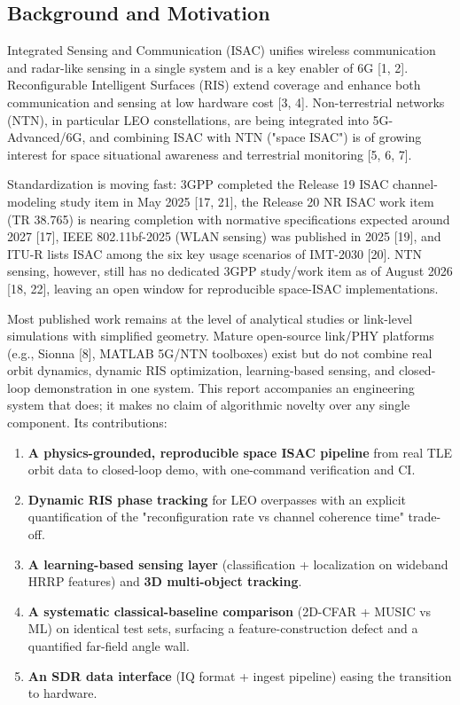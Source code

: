\documentclass[11pt]{article}
\begin{document}
\subsection{Background and Motivation}

Integrated Sensing and Communication (ISAC) unifies wireless communication and radar-like sensing in a single system and is a key enabler of 6G [1, 2]. Reconfigurable Intelligent Surfaces (RIS) extend coverage and enhance both communication and sensing at low hardware cost [3, 4]. Non-terrestrial networks (NTN), in particular LEO constellations, are being integrated into 5G-Advanced/6G, and combining ISAC with NTN ("space ISAC") is of growing interest for space situational awareness and terrestrial monitoring [5, 6, 7].

Standardization is moving fast: 3GPP completed the Release 19 ISAC channel-modeling study item in May 2025 [17, 21], the Release 20 NR ISAC work item (TR 38.765) is nearing completion with normative specifications expected around 2027 [17], IEEE 802.11bf-2025 (WLAN sensing) was published in 2025 [19], and ITU-R lists ISAC among the six key usage scenarios of IMT-2030 [20]. NTN sensing, however, still has no dedicated 3GPP study/work item as of August 2026 [18, 22], leaving an open window for reproducible space-ISAC implementations.

Most published work remains at the level of analytical studies or link-level simulations with simplified geometry. Mature open-source link/PHY platforms (e.g., Sionna [8], MATLAB 5G/NTN toolboxes) exist but do not combine real orbit dynamics, dynamic RIS optimization, learning-based sensing, and closed-loop demonstration in one system. This report accompanies an engineering system that does; it makes no claim of algorithmic novelty over any single component. Its contributions:

\begin{enumerate}
\item \textbf{A physics-grounded, reproducible space ISAC pipeline} from real TLE orbit data to closed-loop demo, with one-command verification and CI.
\item \textbf{Dynamic RIS phase tracking} for LEO overpasses with an explicit quantification of the "reconfiguration rate vs channel coherence time" trade-off.
\item \textbf{A learning-based sensing layer} (classification + localization on wideband HRRP features) and \textbf{3D multi-object tracking}.
\item \textbf{A systematic classical-baseline comparison} (2D-CFAR + MUSIC vs ML) on identical test sets, surfacing a feature-construction defect and a quantified far-field angle wall.
\item \textbf{An SDR data interface} (IQ format + ingest pipeline) easing the transition to hardware.
\end{enumerate}
\end{document}
